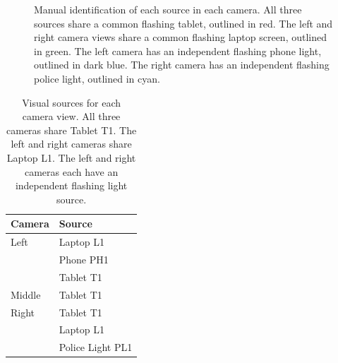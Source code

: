 \begin{figure}
  \begin{center}
    \caption{Manual identification of each source in each camera. All three sources share
      a common flashing tablet, outlined in red. The left and right camera views share a
      common flashing laptop screen, outlined in green. The left camera has an independent
      flashing phone light, outlined in dark blue. The right camera has an independent
      flashing police light, outlined in cyan.}
    \label{fig:chpt10:mcca_sources}
  \end{center}
\end{figure}

\begin{table}[h!]
\centering
\begin{tabular}{l|l}\toprule
Camera & Source\\
\midrule
Left & Laptop L1\\
& Phone PH1\\
& Tablet T1\\
\midrule
Middle & Tablet T1\\
\midrule
Right & Tablet T1\\
& Laptop L1 \\
& Police Light PL1\\
\bottomrule
\end{tabular}
\caption{Visual sources for each camera view. All three cameras share Tablet T1. The left
  and right cameras share Laptop L1. The left and right cameras each have an independent
  flashing light source.}
\label{tab:mcca_descrp}
\end{table}

